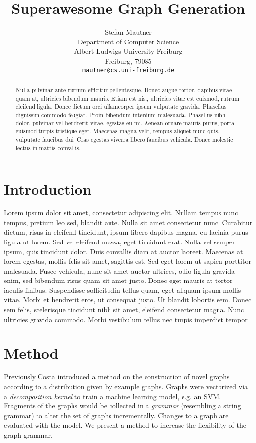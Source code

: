 \documentclass{article}
\title{Superawesome Graph Generation}
\author{
  Stefan Mautner\\
  Department of Computer Science\\
  Albert-Ludwigs University Freiburg\\
  Freiburg, 79085  \\
  \texttt{mautner@cs.uni-freiburg.de} \\
}
\begin{document}

\maketitle

\begin{abstract}
Nulla pulvinar ante rutrum efficitur pellentesque. Donec augue tortor, dapibus vitae quam at, ultricies bibendum mauris. Etiam est nisi, ultricies vitae est euismod, rutrum eleifend ligula. Donec dictum orci ullamcorper ipsum vulputate gravida. Phasellus dignissim commodo feugiat. Proin bibendum interdum malesuada. Phasellus nibh dolor, pulvinar vel hendrerit vitae, egestas eu mi. Aenean ornare mauris purus, porta euismod turpis tristique eget. Maecenas magna velit, tempus aliquet nunc quis, vulputate faucibus dui. Cras egestas viverra libero faucibus vehicula. Donec molestie lectus in mattis convallis.
\end{abstract}
\section{Introduction}
Lorem ipsum dolor sit amet, consectetur adipiscing elit. Nullam tempus nunc tempus, pretium leo sed, blandit ante. Nulla sit amet consectetur nunc. Curabitur dictum, risus in eleifend tincidunt, ipsum libero dapibus magna, eu lacinia purus ligula ut lorem. Sed vel eleifend massa, eget tincidunt erat. Nulla vel semper ipsum, quis tincidunt dolor. Duis convallis diam at auctor laoreet. Maecenas at lorem egestas, mollis felis sit amet, sagittis est. Sed eget lorem ut sapien porttitor malesuada. Fusce vehicula, nunc sit amet auctor ultrices, odio ligula gravida enim, sed bibendum risus quam sit amet justo. Donec eget mauris at tortor iaculis finibus. Suspendisse sollicitudin tellus quam, eget aliquam ipsum mollis vitae. Morbi et hendrerit eros, ut consequat justo. Ut blandit lobortis sem. Donec sem felis, scelerisque tincidunt nibh sit amet, eleifend consectetur magna. Nunc ultricies gravida commodo. Morbi vestibulum tellus nec turpis imperdiet tempor

\section{Method}
Previously Costa introduced a method %
on the construction of novel graphs according to a distribution given by
example graphs. Graphs were vectorized via a \emph{decomposition kernel}
to train a machine learning model, e.g. an SVM.
Fragments of the graphs would be collected in 
a \emph{grammar} (resembling a string grammar) to alter the 
set of graphs incrementally. Changes to a graph are evaluated with the model. 
We present a method to increase the flexibility of the graph grammar.
\end{document}
